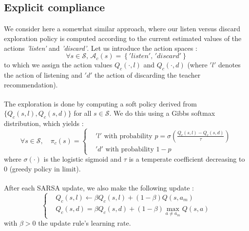 \documentclass[a4paper]{report}
\begin{document}
{{{{		}
	
		\subsection{Explicit compliance}
		{
			\paragraph{} We consider here a somewhat similar approach, where our listen versus discard exploration policy is computed according to the current estimated values of the actions \emph{'listen'} and \emph{'discard'}. Let us introduce the action spaces : 
			\begin{equation}
				\forall s\in\mathcal{S}, \, \mathcal{A}_c(s) = \left\{ 'listen', \, 'discard'\right\}
			\end{equation}
			to which we assign the action values $Q_c(\cdot,l)$ and  $Q_c(\cdot,d)$ (where $'l'$ denotes the action of listening and $'d'$ the action of discarding the teacher recommendation). 
			
			\paragraph{} The exploration is done by computing a soft policy derived from $\{Q_c(s,l), Q_c(s,d)\}$ for all $s\in\mathcal{S}$. We do this using a Gibbs softmax distribution, which yields : 
			\begin{equation}
				\forall s \in\mathcal{S}, \quad \pi_c(s) = 
					\left\{
						\begin{aligned}
							&'l' \text{ with probability } p=\sigma\left(\frac{Q_c(s,l) - Q_c(s,d)}{\tau} \right) \\
							& 'd'  \text{ with probability } 1-p
						\end{aligned}
					\right.
			\end{equation}
			where $\sigma(\cdot)$ is the logistic sigmoid and $\tau$ is a temperate coefficient decreasing to $0$ (greedy policy in limit). 
			
			\paragraph{} After each SARSA update, we also make the following update : 
			\begin{equation}
				\label{eq::av_update_rule}
				\left\{
				\begin{aligned}
					&Q_c(s,l) \leftarrow  \beta Q_c(s,l) + (1-\beta)Q(s,a_m) \\
					&Q_c(s,d) = \beta Q_c(s,d) + (1-\beta)\max_{a\neq a_m} Q(s,a) 
				\end{aligned}
				\right.
			\end{equation}
			with $\beta >0$ the update rule's learning rate. 
}}}}
\end{document}

